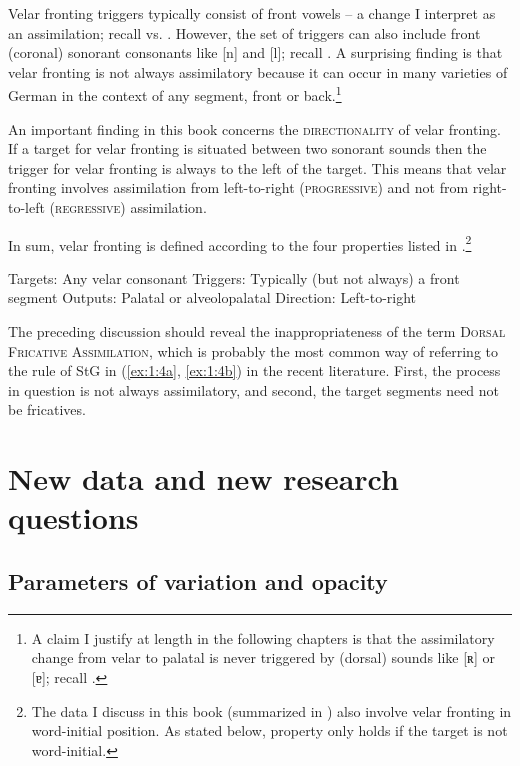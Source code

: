 Velar fronting triggers typically consist of front vowels -- a change I interpret as an assimilation; recall  vs. . However, the set of triggers can also include front (coronal) sonorant consonants like [n] and [l]; recall . A surprising finding is that velar fronting is not always assimilatory because it can occur in many varieties of German in the context of any segment, front or back.\footnote{A claim I justify at length in the following chapters is that the assimilatory change from velar to palatal is never triggered by (dorsal) sounds like [ʀ] or [ɐ]; recall .}

An important finding in this book concerns the \textsc{directionality} of velar fronting. If a target for velar fronting is situated between two sonorant sounds then the trigger for velar fronting is always to the left of the target. This means that velar fronting involves assimilation from left-to-right (\textsc{progressive}) and not from right-to-left (\textsc{regressive}) assimilation.

In sum, velar fronting is defined according to the four properties listed in .\footnote{The data I discuss in this book (summarized in ) also involve velar fronting in word-initial position. As stated below, property  only holds if the target is not word-initial.}

\ea%
\label{ex:1:6}
\ea\label{ex:1:6a}Targets: Any velar consonant
\ex\label{ex:1:6b}Triggers: Typically (but not always) a front segment
\ex\label{ex:1:6c}Outputs: Palatal or alveolopalatal
\ex\label{ex:1:6d}Direction: Left-to-right
\z
\z

The preceding discussion should reveal the inappropriateness of the term \textsc{Dorsal} \textsc{Fricative} \textsc{Assimilation}, which is probably the most common way of referring to the rule of StG in (\ref{ex:1:4a}, \ref{ex:1:4b}) in the recent literature. First, the process in question is not always assimilatory, and second, the target segments need not be fricatives.

\section{New data and new research questions}\label{sec:1.4}

\subsection{Parameters of variation and opacity}\label{sec:1.4.1}
